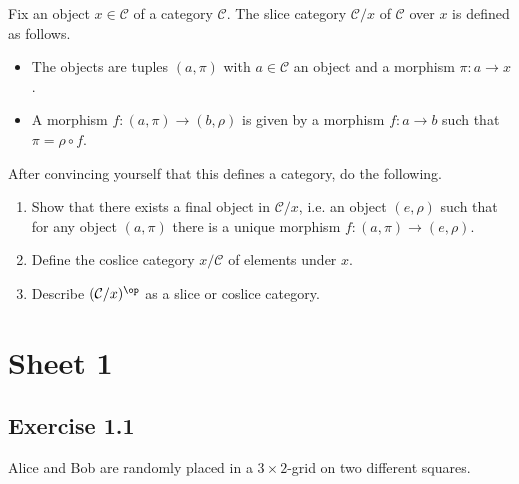 Fix an object $ x \in \mathcal{ C } $ of a category $ \mathcal{ C } $. 
The slice category $ \mathcal{ C } / x $ of $ \mathcal{ C } $ over $ x $ is defined as follows.
\begin{itemize}
    \item 
    The objects are tuples $ ( a , \pi ) $ with $ a  \in \mathcal{ C } $ an object and a morphism $ \pi \colon a \to x $. 
    \item 
    A morphism $ f \colon ( a , \pi ) \to ( b , \rho ) $ is given by a morphism $ f \colon a \to b $ such that $ \pi = \rho \circ f $.
\end{itemize}

After convincing yourself that this defines a category, do the following.

\begin{enumerate}[label=(\alph*)]

    \item 
    Show that there exists a final object in $ \mathcal{ C } / x $, i.e. an object $ ( e , \rho ) $ such that for any object $ ( a , \pi ) $ there is a unique morphism $ f \colon ( a , \pi ) \to ( e , \rho ) $.
    \item 
    
    Define the coslice category $ x / \mathcal{ C } $ of elements under $ x $.
    
    \item 
    Describe $ ( \mathcal{ C } / x )^{ \op } $ as a slice or coslice category.
    
\end{enumerate}

\section{ Sheet 1 }

\subsection{ Exercise 1.1 }

Alice and Bob are randomly placed in a $ 3 \times 2 $-grid on two different squares.
\begin{center}
\end{center}

